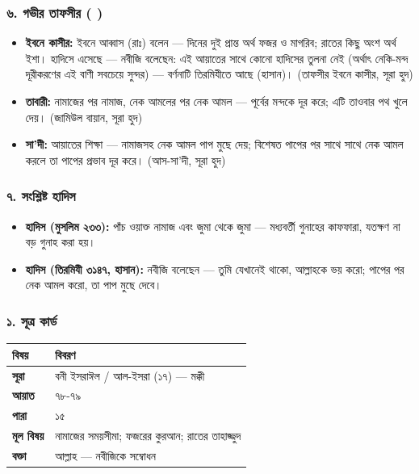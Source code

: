 \subsubsection*{৬. গভীর তাফসীর ( )}

\begin{itemize}
\item \textbf{ইবনে কাসীর:} ইবনে আব্বাস (রাঃ) বলেন — দিনের দুই প্রান্ত অর্থ ফজর ও মাগরিব; রাতের কিছু অংশ অর্থ ইশা। হাদিসে এসেছে — নবীজি বলেছেন: এই আয়াতের সাথে কোনো হাদিসের তুলনা নেই (অর্থাৎ নেকি-মন্দ দূরীকরণের এই বাণী সবচেয়ে সুন্দর) — বর্ণনাটি তিরমিযীতে আছে (হাসান)। (তাফসীর ইবনে কাসীর, সূরা হুদ)
\item \textbf{তাবারী:} নামাজের পর নামাজ, নেক আমলের পর নেক আমল — পূর্বের মন্দকে দূর করে; এটি তাওবার পথ খুলে দেয়। (জামিউল বায়ান, সূরা হুদ)
\item \textbf{সা'দী:} আয়াতের শিক্ষা — নামাজসহ নেক আমল পাপ মুছে দেয়; বিশেষত পাপের পর সাথে সাথে নেক আমল করলে তা পাপের প্রভাব দূর করে। (আস-সা'দী, সূরা হুদ)
\end{itemize}
\subsubsection*{৭. সংশ্লিষ্ট হাদিস}

\begin{itemize}
\item \textbf{হাদিস (মুসলিম ২৩৩):} পাঁচ ওয়াক্ত নামাজ এবং জুমা থেকে জুমা — মধ্যবর্তী গুনাহের কাফফারা, যতক্ষণ না বড় গুনাহ করা হয়।
\item \textbf{হাদিস (তিরমিযী ৩১৪৭, হাসান):} নবীজি বলেছেন — তুমি যেখানেই থাকো, আল্লাহকে ভয় করো; পাপের পর নেক আমল করো, তা পাপ মুছে দেবে।
\end{itemize}
\subsubsection*{১. সূত্র কার্ড}

\begin{table}[h]\centering\small
\begin{tabular}{ll}
বিষয় & বিবরণ \\
\hline
\textbf{সূরা} & বনী ইসরাঈল / আল-ইসরা (১৭) — মক্কী \\
\textbf{আয়াত} & ৭৮-৭৯ \\
\textbf{পারা} & ১৫ \\
\textbf{মূল বিষয়} & নামাজের সময়সীমা; ফজরের কুরআন; রাতের তাহাজ্জুদ \\
\textbf{বক্তা} & আল্লাহ — নবীজিকে সম্বোধন \\
\hline
\end{tabular}
\end{table}

